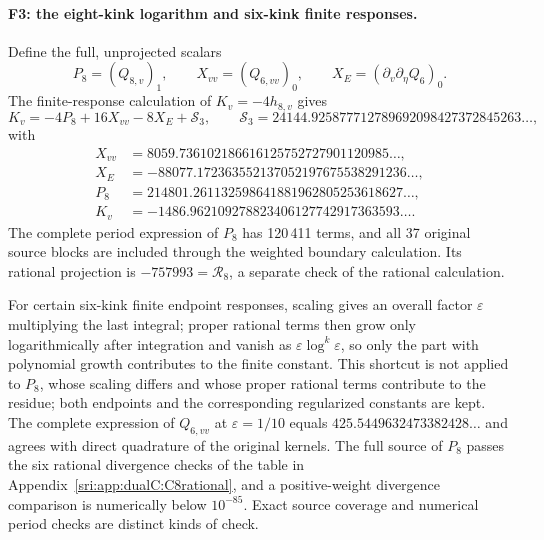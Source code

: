 \paragraph{F3: the eight-kink logarithm and six-kink finite responses.} Define the full, unprojected scalars
\begin{equation}
 P_8=(Q_{8,v})_1,\qquad X_{vv}=(Q_{6,vv})_0,\qquad X_E=(\partial_v\partial_\eta Q_6)_0 .
\end{equation}
The finite-response calculation of $K_v=-4h_{8,v}$ gives
\begin{equation}
 K_v=-4P_8+16X_{vv}-8X_E+\mathcal S_3,\qquad \mathcal S_3=24144.925877712789692098427372845263\ldots,
\end{equation}
with
\begin{equation}
\begin{aligned}
 X_{vv}&=8059.736102186616125752727901120985\ldots,\\
 X_E&=-88077.172363552137052197675538291236\ldots,\\
 P_8&=214801.261132598641881962805253618627\ldots,\\
 K_v&=-1486.962109278823406127742917363593\ldots .
\end{aligned}
\end{equation}
The complete period expression of $P_8$ has 120\,411 terms, and all 37 original source blocks are included through the
weighted boundary calculation. Its rational projection is $-757993=\mathcal R_8$, a separate check of the rational
calculation.

For certain six-kink finite endpoint responses, scaling gives an overall factor $\varepsilon$ multiplying the last
integral; proper rational terms then grow only logarithmically after integration and vanish as
$\varepsilon\log^k\varepsilon$, so only the part with polynomial growth contributes to the finite constant. This
shortcut is not applied to $P_8$, whose scaling differs and whose proper rational terms contribute to the residue;
both endpoints and the corresponding regularized constants are kept. The complete expression of $Q_{6,vv}$ at
$\varepsilon=1/10$ equals $425.5449632473382428\ldots$ and agrees with direct quadrature of the original kernels. The
full source of $P_8$ passes the six rational divergence checks of the table in Appendix~\ref{sri:app:dualC:C8rational}, and a
positive-weight divergence comparison is numerically below $10^{-85}$. Exact source coverage and numerical period checks
are distinct kinds of check.

